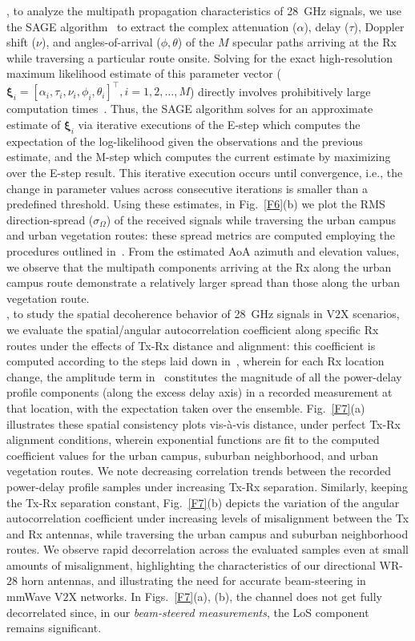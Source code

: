 \documentclass[10pt, twocolumn]{IEEEtran}
\begin{document}
, to analyze the multipath propagation characteristics of \SI{28}{\giga\hertz} signals, we use the SAGE algorithm~\cite{SAGE} to extract the complex attenuation ($\alpha$), delay ($\tau$), Doppler shift ($\nu$), and angles-of-arrival ($\phi,\theta$) of the $M$ specular paths arriving at the Rx while traversing a particular route onsite. Solving for the exact high-resolution maximum likelihood estimate of this parameter vector ($\bm{\xi}_{i}{=}[\alpha_{i},\tau_{i},\nu_{i},\phi_{i},\theta_{i}]^{\intercal},i{=}1,2,{\dots},M$) directly involves prohibitively large computation times~\cite{SAGE}. Thus, the SAGE algorithm solves for an approximate estimate of $\bm{\xi}_{i}$ via iterative executions of the E-step which computes the expectation of the log-likelihood given the observations and the previous estimate, and the M-step which computes the current estimate by maximizing over the E-step result. This iterative execution occurs until convergence, i.e., the change in parameter values across consecutive iterations is smaller than a predefined threshold. Using these estimates, in Fig.~\ref{F6}(b) we plot the RMS direction-spread ($\sigma_{\Omega}$) of the received signals while traversing the urban campus and urban vegetation routes: these spread metrics are computed employing the procedures outlined in~\cite{Indoor60G}. From the estimated AoA azimuth and elevation values, we observe that the multipath components arriving at the Rx along the urban campus route demonstrate a relatively larger spread than those along the urban vegetation route.
\\, to study the spatial decoherence behavior of \SI{28}{\giga\hertz} signals in V$2$X scenarios, we evaluate the spatial/angular autocorrelation coefficient along specific Rx routes under the effects of Tx-Rx distance and alignment: this coefficient is computed according to the steps laid down in~\cite{MacCartneySpatialStatistics}, wherein for each Rx location change, the amplitude term in~\cite{MacCartneySpatialStatistics} constitutes the magnitude of all the power-delay profile components (along the excess delay axis) in a recorded measurement at that location, with the expectation taken over the ensemble. Fig.~\ref{F7}(a) illustrates these spatial consistency plots vis-\`{a}-vis distance, under perfect Tx-Rx alignment conditions, wherein exponential functions are fit to the computed coefficient values for the urban campus, suburban neighborhood, and urban vegetation routes. We note decreasing correlation trends between the recorded power-delay profile samples under increasing Tx-Rx separation. Similarly, keeping the Tx-Rx separation constant, Fig.~\ref{F7}(b) depicts the variation of the angular autocorrelation coefficient under increasing levels of misalignment between the Tx and Rx antennas, while traversing the urban campus and suburban neighborhood routes. We observe rapid decorrelation across the evaluated samples even at small amounts of misalignment, highlighting the characteristics of our directional WR-$28$ horn antennas, and illustrating the need for accurate beam-steering in mmWave V$2$X networks. In Figs.~\ref{F7}(a), (b), the channel does not get fully decorrelated since, in our \emph{beam-steered measurements}, the LoS component remains significant.
\end{document}

